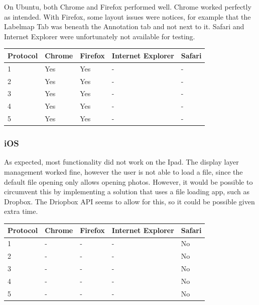 \documentclass[a4paper,11pt,twoside]{article}
\begin{document}
On Ubuntu, both Chrome and Firefox performed well. Chrome worked perfectly as intended. With Firefox, some layout issues were notices, for example that the Labelmap Tab was beneath the Annotation tab and not next to it. Safari and Internet Explorer were unfortunately not available for testing.

\begin{center}

  \begin{tabular}{ | l || l | l | l | l |}
    \hline
    Protocol & Chrome & Firefox & Internet Explorer & Safari \\ \hline \hline
    1 & Yes & Yes  & -  & - \\ \hline
    2 & Yes & Yes & - & - \\ \hline
    3 & Yes & Yes & - & - \\ \hline
    4 & Yes & Yes & - & - \\ \hline
    5 & Yes & Yes & - & - \\
    \hline
  \end{tabular}

\end{center}


\subsubsection*{iOS}

As expected, most functionality did not work on the Ipad. The display layer management worked fine, however the user is not able to load a file, since the default file opening only allows opening photos. However, it would be possible to circumvent this by implementing a solution that uses a file loading app, such as Dropbox. The Driopbox API seems to allow for this, so it could be possible given extra time.

\begin{center}

  \begin{tabular}{ | l || l | l | l | l |}
    \hline
    Protocol & Chrome & Firefox & Internet Explorer & Safari \\ \hline \hline
    1 & - & -  & -  & No \\ \hline
    2 & - & - & - & No \\ \hline
    3 & - & - & - & No \\ \hline
    4 & - & - & - & No \\ \hline
    5 & - & - & - & No \\
    \hline
  \end{tabular}

\end{center}
\end{document}
